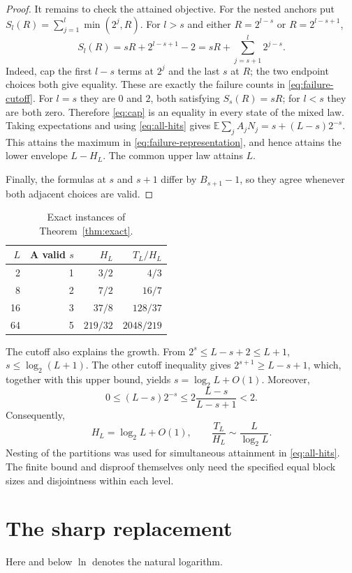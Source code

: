 \documentclass[11pt]{article}
\theoremstyle{remark}
\newcommand{\E}{\mathbb E}
\begin{document}
\begin{proof}
It remains to check the attained objective. For the nested anchors put
$S_l(R)=\sum_{j=1}^l\min(2^j,R)$. For $l>s$ and either
$R=2^{l-s}$ or $R=2^{l-s+1}$,
\[
 S_l(R)=sR+2^{l-s+1}-2
       =sR+\sum_{j=s+1}^l2^{j-s}.
\]
Indeed, cap the first $l-s$ terms at $2^j$ and the last $s$ at $R$;
the two endpoint choices both give equality. These are exactly the
failure counts in \eqref{eq:failure-cutoff}. For $l=s$ they are $0$
and $2$, both satisfying $S_s(R)=sR$; for $l<s$ they are both zero.
Therefore \eqref{eq:cap} is an equality in every state of the mixed law.
Taking expectations and using \eqref{eq:all-hits} gives
$\E\sum_j A_jN_j=s+(L-s)2^{-s}$. This attains the maximum in
\eqref{eq:failure-representation}, and hence attains the lower envelope
$L-H_L$. The common upper law attains $L$.

Finally, the formulas at $s$ and $s+1$ differ by $B_{s+1}-1$, so they
agree whenever both adjacent choices are valid.
\end{proof}

\begin{table}[htbp]
\centering
\begin{tabular}{rrrr}
\toprule
$L$ & A valid $s$ & $H_L$ & $T_L/H_L$\\
\midrule
2 & 1 & $3/2$ & $4/3$\\
8 & 2 & $7/2$ & $16/7$\\
16 & 3 & $37/8$ & $128/37$\\
64 & 5 & $219/32$ & $2048/219$\\
\bottomrule
\end{tabular}
\caption{Exact instances of Theorem~\ref{thm:exact}.}\label{tab:examples}
\end{table}

The cutoff also explains the growth. From $2^s\le L-s+2\le L+1$,
$s\le\log_2(L+1)$. The other cutoff inequality gives
$2^{s+1}\ge L-s+1$, which, together with this upper bound, yields
$s=\log_2 L+O(1)$. Moreover,
\[
 0\le (L-s)2^{-s}\le 2\frac{L-s}{L-s+1}<2.
\]
Consequently,
\begin{equation}\label{eq:family-asymptotic}
 H_L=\log_2 L+O(1),\qquad
 \frac{T_L}{H_L}\sim\frac{L}{\log_2 L}.
\end{equation}
Nesting of the partitions was used for simultaneous attainment in
\eqref{eq:all-hits}. The finite bound and disproof themselves only need
the specified equal block sizes and disjointness within each level.

\section{The sharp replacement}\label{sec:sharp}
Here and below $\ln$ denotes the natural logarithm.
\end{document}
